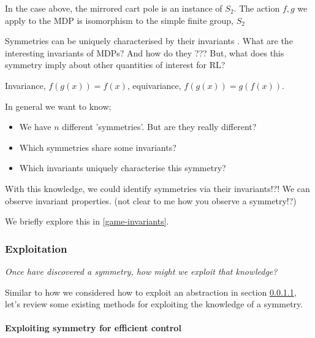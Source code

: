 In the case above, the mirrored cart pole is an instance of $S_2$.
The action $f, g$ we apply to the MDP is isomorphism to the simple finite group, $S_2$

Symmetries can be uniquely characterised by their invariants \cite{PeterOlver1999}.
What are the interesting invariants of MDPs? And how do they ???
But, what does this symmetry imply about other quantities of interest for RL?

Invariance, $f(g(x)) = f(x)$, equivariance, $f(g(x)) = g(f(x))$.

In general we want to know;

\begin{itemize}
	\tightlist
	\item We have $n$ different 'symmetries'. But are they really different?
	\item Which symmetries share some invariants?
	\item Which invariants uniquely characterise this symmetry?
\end{itemize}

With this knowledge, we could identify symmetries via their invariants!?!
We can observe invariant properties. (not clear to me how you observe a symmetry!?)

We briefly explore this in \ref{game-invariants}.

\subsubsection{Exploitation} \label{symmetric-exploitation}

\begin{displayquote}
\textsl{Once have discovered a symmetry, how might we exploit that knowledge?}
\end{displayquote}

Similar to how we considered how to exploit an abstraction in section \ref{},
let's review some existing methods for exploiting the knowledge of a symmetry. \footnotemark[22]



\paragraph{Exploiting symmetry for efficient control}

